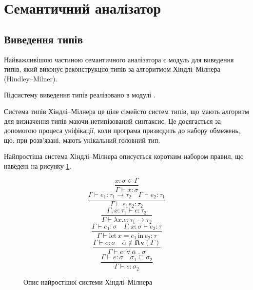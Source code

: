 \documentclass[main.tex]{subfiles}
\begin{document}
\FloatBarrier
\section{Семантичний аналізатор}
\subsection{Виведення типів}
Найважливішою частиною семантичного аналізатора є модуль для виведення типів, який виконує реконструкцію типів за алгоритмом Хіндлі--Мілнера (Hindley--Milner).

Підсистему виведення типів реалізовано в модулі .

Система типів Хіндлі--Мілнера це ціле сімейсто систем типів, що мають алгоритм для визначення типів маючи нетипізований синтаксис.
Це досягається за допомогою процеса уніфікації, коли програма призводить до набору обмежень, що, при розв'язані, мають унікальний головний тип.

Найпростіша система Хіндлі--Мілнера описується коротким набором правил, що наведені на рисунку \ref{hindley-milner}.

\begin{figure}[h]
  \centering
  \begin{equation}
    \tag*{(T-Var)}
    \frac{x : \sigma \in \Gamma}{\Gamma \vdash x : \sigma}
  \end{equation}
  \begin{equation}
    \tag*{(T-App)}
    \frac{\Gamma \vdash e_1 : \tau_1 \rightarrow \tau_2 \quad \Gamma \vdash e_2 : \tau_1}{\Gamma \vdash e_1 e_2 : \tau_2}
  \end{equation}
  \begin{equation}
    \tag*{(T-Lam)}
    \frac{\Gamma, x : \tau_1 \vdash e : \tau_2}{\Gamma \vdash \lambda x . e : \tau_1 \rightarrow \tau_2}
  \end{equation}
  \begin{equation}
    \tag*{(T-Let)}
    \frac{\Gamma \vdash e_1 : \sigma \quad \Gamma, x : \sigma \vdash e_2 : \tau}{\Gamma \vdash \text{let} \, x = e_1 \, \text{in} \, e_2 : \tau}
  \end{equation}
  \begin{equation}
    \tag*{(T-Gen)}
    \frac{\Gamma \vdash e : \sigma \quad \overline{\alpha} \notin \textbf{ftv}(\Gamma)}{\Gamma \vdash e : \forall \, \overline{\alpha} \; . \; \sigma}
  \end{equation}
  \begin{equation}
    \tag*{(T-Inst)}
    \frac{\Gamma \vdash e : \sigma \quad \sigma_1 \sqsubseteq \sigma_2}{\Gamma \vdash e : \sigma_2}
  \end{equation}
  \caption{Опис найростішої системи Хіндлі--Мілнера}
  \label{hindley-milner}
\end{figure}
\end{document}
